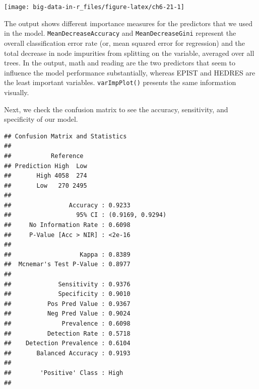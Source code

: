 \documentclass[]{book}
\newenvironment{Shaded}{\begin{snugshade}}{\end{snugshade}}
\newcommand{\DataTypeTok}[1]{\textcolor[rgb]{0.13,0.29,0.53}{#1}}
\newcommand{\KeywordTok}[1]{\textcolor[rgb]{0.13,0.29,0.53}{\textbf{#1}}}
\newcommand{\NormalTok}[1]{#1}
\newcommand{\OperatorTok}[1]{\textcolor[rgb]{0.81,0.36,0.00}{\textbf{#1}}}
\newcommand{\StringTok}[1]{\textcolor[rgb]{0.31,0.60,0.02}{#1}}
\begin{document}
\texttt{[image: big-data-in-r\_files/figure-latex/ch6-21-1]}

The output shows different importance measures for the predictors that we used in the model. \texttt{MeanDecreaseAccuracy} and \texttt{MeanDecreaseGini} represent the overall classification error rate (or, mean squared error for regression) and the total decrease in node impurities from splitting on the variable, averaged over all trees. In the output, math and reading are the two predictors that seem to influence the model performance substantially, whereas EPIST and HEDRES are the least important variables. \texttt{varImpPlot()} presents the same information visually.

Next, we check the confusion matrix to see the accuracy, sensitivity, and specificity of our model.

\begin{Shaded}
\end{Shaded}

\begin{verbatim}
## Confusion Matrix and Statistics
## 
##           Reference
## Prediction High  Low
##       High 4058  274
##       Low   270 2495
##                                           
##                Accuracy : 0.9233          
##                  95% CI : (0.9169, 0.9294)
##     No Information Rate : 0.6098          
##     P-Value [Acc > NIR] : <2e-16          
##                                           
##                   Kappa : 0.8389          
##  Mcnemar's Test P-Value : 0.8977          
##                                           
##             Sensitivity : 0.9376          
##             Specificity : 0.9010          
##          Pos Pred Value : 0.9367          
##          Neg Pred Value : 0.9024          
##              Prevalence : 0.6098          
##          Detection Rate : 0.5718          
##    Detection Prevalence : 0.6104          
##       Balanced Accuracy : 0.9193          
##                                           
##        'Positive' Class : High            
## 
\end{verbatim}
\end{document}
